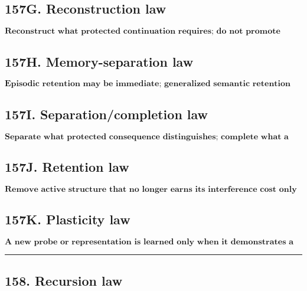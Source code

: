\documentclass[
]{article}
\begin{document}
\subsection{157G. Reconstruction law}\label{reconstruction-law}

\[
\boxed{
\textbf{Reconstruct what protected continuation requires; do not promote
generated reconstruction detail into history.}
}
\]

\subsection{157H. Memory-separation law}\label{memory-separation-law}

\[
\boxed{
\textbf{Episodic retention may be immediate; generalized semantic retention
requires separate challenge and warrant.}
}
\]

\subsection{157I. Separation/completion law}\label{separation-completion-law}

\[
\boxed{
\textbf{Separate what protected consequence distinguishes; complete what a
consequential cue requires.}
}
\]

\subsection{157J. Retention law}\label{retention-law}

\[
\boxed{
\textbf{Remove active structure that no longer earns its interference cost only
when protected reconstruction, warrant ancestry, and reopening survive.}
}
\]

\subsection{157K. Plasticity law}\label{plasticity-law}

\[
\boxed{
\textbf{A new probe or representation is learned only when it demonstrates a
new protected capacity to distinguish, retrieve, reason, or control.}
}
\]

\begin{center}\rule{0.5\linewidth}{0.5pt}\end{center}

\subsection{158. Recursion law}\label{recursion-law}
\end{document}
